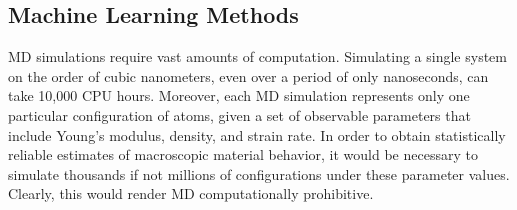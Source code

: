 
%



\subsection{Machine Learning Methods} 


MD simulations require vast amounts of computation. Simulating a single system on the order of cubic nanometers, even over a period of only nanoseconds, can take 10,000 CPU hours.  %
Moreover, each MD simulation represents only one particular configuration of atoms, given a set of observable parameters that include Young's modulus, density, and strain rate.  In order to obtain statistically reliable estimates of macroscopic material behavior, it would be necessary to simulate thousands if not millions of configurations under these parameter values.  Clearly, this would render MD computationally prohibitive.

